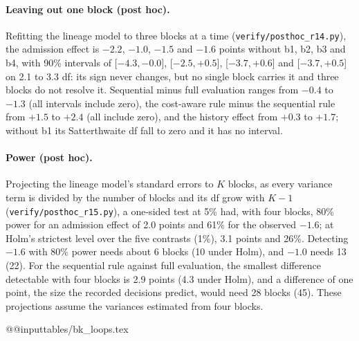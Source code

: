 \documentclass[11pt]{article}
\begin{document}
\paragraph{Leaving out one block (post hoc).} Refitting the lineage model to three blocks at a time (\texttt{verify/posthoc\_r14.py}), the admission effect is $-2.2$, $-1.0$, $-1.5$ and $-1.6$ points without b1, b2, b3 and b4, with 90\% intervals of [$-4.3,-0.0$], [$-2.5,+0.5$], [$-3.7,+0.6$] and [$-3.7,+0.5$] on 2.1 to 3.3 df: its sign never changes, but no single block carries it and three blocks do not resolve it. Sequential minus full evaluation ranges from $-0.4$ to $-1.3$ (all intervals include zero), the cost-aware rule minus the sequential rule from $+1.5$ to $+2.4$ (all include zero), and the history effect from $+0.3$ to $+1.7$; without b1 its Satterthwaite df fall to zero and it has no interval.

\paragraph{Power (post hoc).} Projecting the lineage model's standard errors to $K$ blocks, as every variance term is divided by the number of blocks and its df grow with $K-1$ (\texttt{verify/posthoc\_r15.py}), a one-sided test at 5\% had, with four blocks, 80\% power for an admission effect of 2.0 points and 61\% for the observed $-1.6$; at Holm's strictest level over the five contrasts (1\%), 3.1 points and 26\%. Detecting $-1.6$ with 80\% power needs about 6 blocks (10 under Holm), and $-1.0$ needs 13 (22). For the sequential rule against full evaluation, the smallest difference detectable with four blocks is 2.9 points (4.3 under Holm), and a difference of one point, the size the recorded decisions predict, would need 28 blocks (45). These projections assume the variances estimated from four blocks.

\begin{table}[t]
\centering\small
\setlength{\tabcolsep}{4pt}
\csname @@input\endcsname tables/bk_loops.tex
\caption{Experiment BK, loops summed (or averaged) over the four blocks. Acc.: accepted changes; Full acc.: rounds in which full evaluation would have accepted in the loop's states; Choice stopped: of those, rounds in which the sequential rule stopped full evaluation's choice (for f and h replayed, for c its own cost-aware rule); Stopped: candidates the loop's sequential rule stopped (replayed for f); Cand.\ ep.: candidate-evaluation episodes per loop that the loop's own rule runs; Cost: the loop's dollar cost as if it had run alone, IL's accounting, calibration included; Fork round: the round in which the lineage holding the loop at the end separated from its parent, per block (--: the block's first lineage). In b1, h and s stayed together; in b3 and b4, a stayed with f.}
\label{tab:bkloops}
\end{table}
\end{document}
